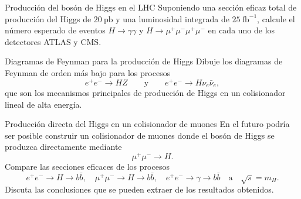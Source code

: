 
\begin{Ejercicio}{Producción del bosón de Higgs en el LHC}\label{Ej:23}
Suponiendo una sección eficaz total de producción del Higgs de $20~\text{pb}$ y una luminosidad integrada de $25~\text{fb}^{-1}$,
calcule el número esperado de eventos $H \to \gamma\gamma$ y $H \to \mu^+\mu^-\mu^+\mu^-$ en cada uno de los detectores ATLAS y CMS.
\end{Ejercicio}



\begin{Ejercicio}{Diagramas de Feynman para la producción de Higgs}\label{Ej:24}
Dibuje los diagramas de Feynman de orden más bajo para los procesos
\[
e^+ e^- \to HZ 
\qquad \text{y} \qquad
e^+ e^- \to H\nu_e \bar{\nu}_e,
\]
que son los mecanismos principales de producción de Higgs en un colisionador lineal de alta energía.
\end{Ejercicio}



\begin{Ejercicio}{Producción directa del Higgs en un colisionador de muones}\label{Ej:25}
En el futuro podría ser posible construir un colisionador de muones donde el bosón de Higgs se produzca directamente mediante
\[
\mu^+ \mu^- \to H.
\]
Compare las secciones eficaces de los procesos
\[
e^+e^- \to H \to b\bar{b}, 
\quad 
\mu^+\mu^- \to H \to b\bar{b},
\quad 
e^+e^- \to \gamma \to b\bar{b}
\quad \text{a} \quad \sqrt{s} = m_H.
\]
Discuta las conclusiones que se pueden extraer de los resultados obtenidos.
\end{Ejercicio}
